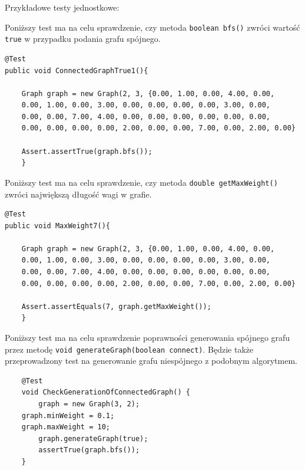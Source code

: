 \documentclass[]{article}
\begin{document}
Przykładowe testy jednostkowe:

Poniższy test ma na celu sprawdzenie, czy metoda \texttt{boolean bfs()} zwróci wartość \texttt{true} w przypadku podania grafu spójnego.

\begin{verbatim}
@Test
public void ConnectedGraphTrue1(){
    
    Graph graph = new Graph(2, 3, {0.00, 1.00, 0.00, 4.00, 0.00,
    0.00, 1.00, 0.00, 3.00, 0.00, 0.00, 0.00, 0.00, 3.00, 0.00,
    0.00, 0.00, 7.00, 4.00, 0.00, 0.00, 0.00, 0.00, 0.00, 0.00,
    0.00, 0.00, 0.00, 0.00, 2.00, 0.00, 0.00, 7.00, 0.00, 2.00, 0.00}
        
    Assert.assertTrue(graph.bfs());
    }
\end{verbatim}

Poniższy test ma na celu sprawdzenie, czy metoda \texttt{double getMaxWeight()} zwróci największą długość wagi w grafie.

\begin{verbatim}
@Test
public void MaxWeight7(){
    
    Graph graph = new Graph(2, 3, {0.00, 1.00, 0.00, 4.00, 0.00,
    0.00, 1.00, 0.00, 3.00, 0.00, 0.00, 0.00, 0.00, 3.00, 0.00,
    0.00, 0.00, 7.00, 4.00, 0.00, 0.00, 0.00, 0.00, 0.00, 0.00,
    0.00, 0.00, 0.00, 0.00, 2.00, 0.00, 0.00, 7.00, 0.00, 2.00, 0.00}
        
    Assert.assertEquals(7, graph.getMaxWeight());
    }
\end{verbatim}

Poniższy test ma na celu sprawdzenie poprawności generowania spójnego grafu przez metodę \texttt{void generateGraph(boolean connect)}. Będzie także przeprowadzony test na generowanie grafu niespójnego z podobnym algorytmem.
\begin{verbatim}
    @Test
    void CheckGenerationOfConnectedGraph() {
        graph = new Graph(3, 2);
	graph.minWeight = 0.1;
	graph.maxWeight = 10;
        graph.generateGraph(true);
        assertTrue(graph.bfs());
    }
\end{verbatim}
\end{document}

